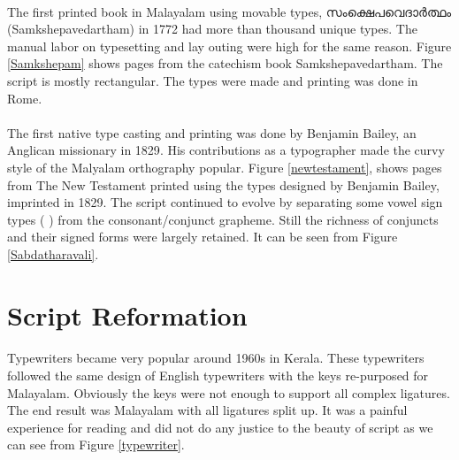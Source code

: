 \documentclass[10pt]{article}
\begin{document}
\paragraph{}
The first printed book in Malayalam using movable types, {\manjari സംക്ഷെപവെദാർത്ഥം} (Samkshepavedartham) in 1772 had more than thousand unique types\cite{babucherian}. The manual labor on typesetting and lay outing were high for the same reason. Figure \ref{Samkshepam} shows pages from the catechism book Samkshepavedartham. The script is mostly rectangular. The types were made and printing was done in Rome. 

\paragraph{}
The first native type casting and printing was done by Benjamin Bailey, an Anglican missionary in 1829\cite{babucherian}.  His contributions as a typographer made the curvy style of the Malyalam orthography popular\cite{gupthannair}. Figure \ref{newtestament}, shows pages from The New Testament printed using the types designed by Benjamin Bailey, imprinted in 1829\cite{babucherian}. The script continued to evolve by separating some vowel sign types ({ }) from the consonant/conjunct grapheme. Still the richness of conjuncts and their signed forms were largely retained. It can be seen from Figure \ref{Sabdatharavali}. 




\section{Script Reformation}

\paragraph{}
Typewriters became very popular around 1960s in Kerala. These typewriters followed the same design of English typewriters with the keys re-purposed for Malayalam. Obviously the keys were not enough to support all complex ligatures. The end result was Malayalam with all ligatures split up. It was a painful experience for reading and did not do any justice to the beauty of script as we can see from Figure \ref{typewriter}.
\end{document}
